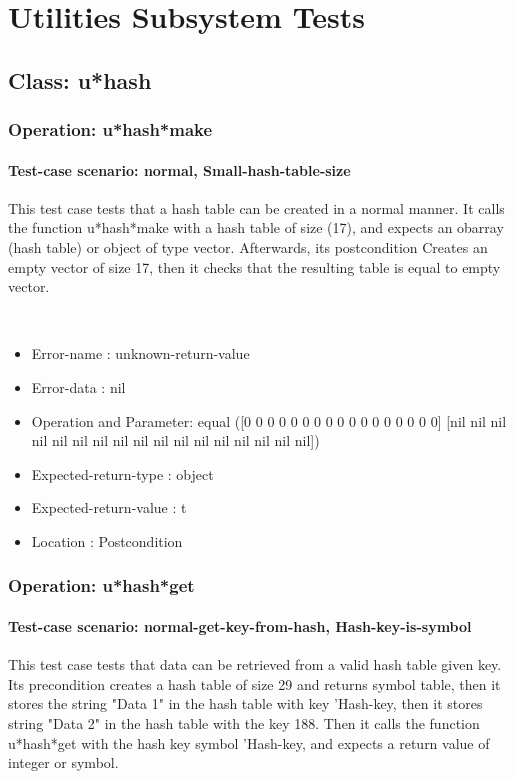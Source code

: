 \chapter{Utilities Subsystem Tests}

\section {Class: u*hash}
\subsection {Operation: u*hash*make}
\subsubsection {Test-case scenario: normal, Small-hash-table-size}


This test case tests that a hash table can be created in a normal manner.
It calls the function u*hash*make  with a hash table of size (17), and expects an obarray (hash table) or object of type vector.
Afterwards, its postcondition Creates an empty vector of size 17, then it checks that the resulting table is equal to empty vector.


\
\begin {itemize}
\item 	Error-name             : unknown-return-value
\item Error-data             : nil
\item Operation and Parameter: equal ([0 0 0 0 0 0 0 0 0 0 0 0 0 0 0 0 0] [nil nil nil nil nil nil nil nil nil nil nil nil nil nil nil nil nil])
\item Expected-return-type   : object
\item Expected-return-value  : t
\item Location               : Postcondition



\end {itemize}
\subsection {Operation: u*hash*get}
\subsubsection {Test-case scenario: normal-get-key-from-hash, Hash-key-is-symbol}


This test case tests that data can be retrieved from a valid hash table given key.
Its precondition creates a hash table of size 29 and returns symbol table, then it stores the string "Data 1" in the hash table with key 'Hash-key, then it stores string "Data 2" in the hash table with the key 188.
Then it calls the function u*hash*get  with the hash key symbol 'Hash-key, and expects a return value of integer or symbol.





